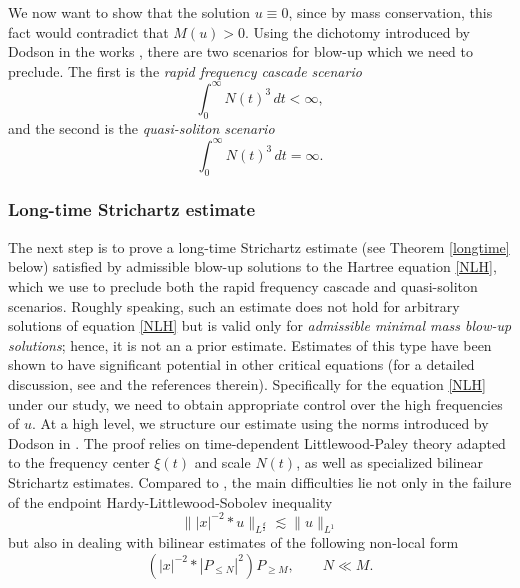 \documentclass[reqno,11pt]{amsart}
\theoremstyle{plain}
\theoremstyle{definition}
\newcommand{\qtq}[1]{\quad\text{#1}\quad}
\numberwithin{equation}{section}
\numberwithin{theorem}{section}
\def\geq{\geqslant}
\def\leq{\leqslant}
\begin{document}
We now want to show that the solution $ u \equiv 0 $, since by mass conservation, this fact would contradict that $ M(u) > 0 $. Using the dichotomy introduced by Dodson in the works \cite{Dodson-JAMS,Dodson-AJM,Dodson-Duke}, there are two scenarios for blow-up which we need to preclude. The first is the \emph{rapid frequency cascade scenario}
\[
\int_0^\infty N(t)^3 \, dt < \infty,
\]
and the second is the \emph{quasi-soliton scenario}
\[
\int_0^\infty N(t)^3 \, dt = \infty. 
\]

\subsubsection{Long-time Strichartz estimate} \label{sec:intro_out_LTSE}

The next step is to prove a long-time Strichartz estimate (see Theorem \ref{longtime} below) satisfied by admissible blow-up solutions to the Hartree equation \eqref{NLH}, which we use to preclude both the rapid frequency cascade and quasi-soliton scenarios. Roughly speaking, such an estimate does not hold for arbitrary solutions of equation \eqref{NLH} but is valid only for \emph{admissible minimal mass blow-up solutions}; hence, it is not an a prior estimate. Estimates of this type have been shown to have significant potential in other critical equations (for a detailed discussion, see \cite{Dodson} and the references therein). Specifically for the equation \eqref{NLH} under our study, we need to obtain appropriate control over the high frequencies of $u$. At a high level, we structure our estimate using the norms introduced by Dodson in \cite{Dodson-JAMS}. The proof relies on time-dependent Littlewood-Paley theory adapted to the frequency center $ \xi(t) $ and scale $ N(t) $, as well as specialized bilinear Strichartz estimates. Compared to \cite{Dodson-JAMS}, the main difficulties lie not only in the failure of the endpoint Hardy-Littlewood-Sobolev inequality 
\[
\big\||x|^{-2}\ast u\big\|_{L^{\frac{d}{2}}}\lesssim \|u\|_{L^1}
\]
but also in dealing with bilinear estimates of the following non-local form
\[
(|x|^{-2}\ast|P_{\leq N}|^2)P_{\geq M},\qtq{} N\ll M.
\]
\end{document}
